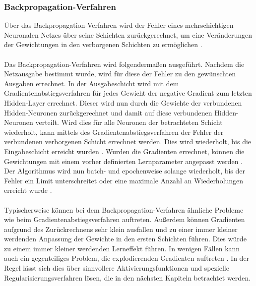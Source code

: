 \documentclass[11pt,bibliography=totocnumbered]{scrartcl}
\begin{document}
\subsubsection{Backpropagation-Verfahren}
Über das Backpropagation-Verfahren wird der Fehler eines mehrschichtigen Neuronalen Netzes über seine Schichten zurückgerechnet, um eine Veränderungen der Gewichtungen in den verborgenen Schichten zu ermöglichen \cite[S.51-52]{NN}.
\\\\
Das Backpropagation-Verfahren wird folgendermaßen ausgeführt. Nachdem die Netzausgabe bestimmt wurde, wird für diese der Fehler zu den gewünschten Ausgaben errechnet. In der Ausgabeschicht wird mit dem Gradientenabstiegsverfahren für jedes Gewicht der negative Gradient zum letzten Hidden-Layer errechnet. Dieser wird nun durch die Gewichte der verbundenen Hidden-Neuronen zurückgerechnet und damit auf diese verbundenen Hidden-Neuronen verteilt. Wird dies für alle Neuronen der betrachteten Schicht wiederholt, kann mittels des Gradientenabstiegsverfahren der Fehler der verbundenen verborgenen Schicht errechnet werden. Dies wird wiederholt, bis die Eingabeschicht erreicht wurden \cite[S.33]{BA}\cite[S.52-53]{NN}. Wurden die Gradienten errechnet, können die Gewichtungen mit einem vorher definierten Lernparameter angepasst werden \cite[S.262]{MACHINE_LEARNING}. Der Algorithmus wird nun batch- und epochenweise solange wiederholt, bis der Fehler ein Limit unterschreitet oder eine maximale Anzahl an Wiederholungen erreicht wurde \cite[S.52]{NN}.
\\\\
Typischerweise können bei dem Backpropagation-Verfahren ähnliche Probleme wie beim Gradientenabstiegsverfahren auftreten. Außerdem können Gradienten aufgrund des Zurückrechnens sehr klein ausfallen und zu einer immer kleiner werdenden Anpassung der Gewichte in den ersten Schichten führen. Dies würde zu einem immer kleiner werdenden Lerneffekt führen. In wenigen Fällen kann auch ein gegenteiliges Problem, die explodierenden Gradienten auftreten \cite[S.33-34]{BA}\cite[S.275-276]{MACHINE_LEARNING}. In der Regel lässt sich dies über sinnvollere Aktivierungsfunktionen und spezielle Regularisierungsverfahren lösen, die in den nächsten Kapiteln betrachtet werden. 
\end{document}
